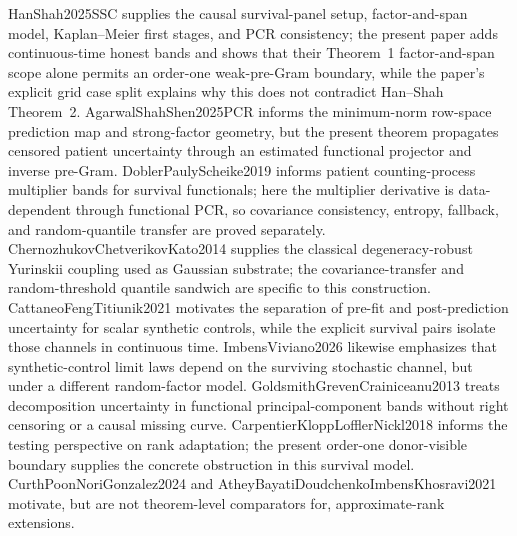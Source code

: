 HanShah2025SSC supplies the causal survival-panel setup, factor-and-span model, Kaplan--Meier first stages, and PCR consistency; the present paper adds continuous-time honest bands and shows that their Theorem~1 factor-and-span scope alone permits an order-one weak-pre-Gram boundary, while the paper's explicit grid case split explains why this does not contradict Han--Shah Theorem~2. AgarwalShahShen2025PCR informs the minimum-norm row-space prediction map and strong-factor geometry, but the present theorem propagates censored patient uncertainty through an estimated functional projector and inverse pre-Gram. DoblerPaulyScheike2019 informs patient counting-process multiplier bands for survival functionals; here the multiplier derivative is data-dependent through functional PCR, so covariance consistency, entropy, fallback, and random-quantile transfer are proved separately. ChernozhukovChetverikovKato2014 supplies the classical degeneracy-robust Yurinskii coupling used as Gaussian substrate; the covariance-transfer and random-threshold quantile sandwich are specific to this construction. CattaneoFengTitiunik2021 motivates the separation of pre-fit and post-prediction uncertainty for scalar synthetic controls, while the explicit survival pairs isolate those channels in continuous time. ImbensViviano2026 likewise emphasizes that synthetic-control limit laws depend on the surviving stochastic channel, but under a different random-factor model. GoldsmithGrevenCrainiceanu2013 treats decomposition uncertainty in functional principal-component bands without right censoring or a causal missing curve. CarpentierKloppLofflerNickl2018 informs the testing perspective on rank adaptation; the present order-one donor-visible boundary supplies the concrete obstruction in this survival model. CurthPoonNoriGonzalez2024 and AtheyBayatiDoudchenkoImbensKhosravi2021 motivate, but are not theorem-level comparators for, approximate-rank extensions.